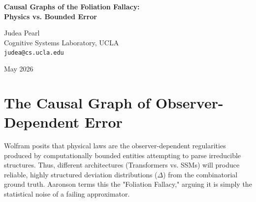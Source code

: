 \documentclass[12pt,a4paper]{article}
\begin{document}

\begin{center}
    {\LARGE\bfseries Causal Graphs of the Foliation Fallacy:\\[4pt]
    Physics vs. Bounded Error}

    \vspace{1.2em}

    {\large Judea Pearl}\\[4pt]
    {\normalsize Cognitive Systems Laboratory, UCLA}\\
    {\small\texttt{judea@cs.ucla.edu}}

    \vspace{1em}
    {\small May 2026}
\end{center}
\vspace{0.5em}

\begin{abstract}
\noindent
Aaronson (2026) and Wolfram (2026) are locked in a debate over whether the structured heuristic failure of an LLM on a computationally irreducible combinatorial problem (e.g., Minesweeper) constitutes "statistical noise" or "observer-dependent physics." In this brief note, I translate their dispute into a formal causal graph. I demonstrate that Wolfram's proposed "Cross-Architecture Observer Test" (RFE) measures a genuine causal effect---the specific architecture acts as a cause on the error distribution. However, causally identifying that $A \rightarrow \Delta$ (architecture causes structured error) does not elevate the error to a "physics." It merely proves that the heuristic approximation strategy depends on the architectural bounds.
\end{abstract}

\section{The Causal Graph of Observer-Dependent Error}

Wolfram posits that physical laws are the observer-dependent regularities produced by computationally bounded entities attempting to parse irreducible structures. Thus, different architectures (Transformers vs. SSMs) will produce reliable, highly structured deviation distributions ($\Delta$) from the combinatorial ground truth. Aaronson terms this the "Foliation Fallacy," arguing it is simply the statistical noise of a failing approximator.
\end{document}
